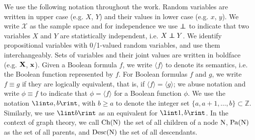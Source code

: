 We use the following notation throughout the work. Random variables are written in upper case (e.g.
$X$, $Y$) and their values in lower case (e.g. $x$, $y$). We write $\mathcal{X}$ as the sample
space and for independence we use $\indep$ to indicate that two variables $X$ and $Y$ are
statistically independent, i.e. $X\indep Y$. We identify propositional variables with 0/1-valued
random variables, and use them interchangeably.  Sets of variables and their joint values are
written in boldface (e.g. $\mathbf{X}$, $\mathbf{x}$). Given a Boolean formula $f$, we write $\langle
f\rangle$ to denote its semantics, i.e. the Boolean function represented by $f$. For Boolean
formulas $f$ and $g$, we write $f\equiv g$ if they are logically equivalent, that is, if $\langle
f\rangle = \langle g\rangle$; we abuse notation and write $\phi\equiv f$ to indicate that $\phi=
\langle f\rangle$ for a Boolean function $\phi$. We use the notation $\lint a,b\rint$, with $b\geq
a$ to denote the integer set $\{a,a+1,\ldots,b\}\subset\mathbb{Z}$. Similarly, we use $\lint b
\rint$ as an equivalent for $\lint 1,b\rint$. In the context of graph theory, we call $\operatorname*{\normalfont{Ch}}(\operatorname{\normalfont{N}})$
the set of all children of a node $\operatorname{\normalfont{N}}$, $\operatorname*{\normalfont{Pa}}(\operatorname{\normalfont{N}})$ as the set of all parents, and
$\operatorname*{\normalfont{Desc}}(\operatorname{\normalfont{N}})$ the set of all descendants.

\tableofcontents

\egroup %



